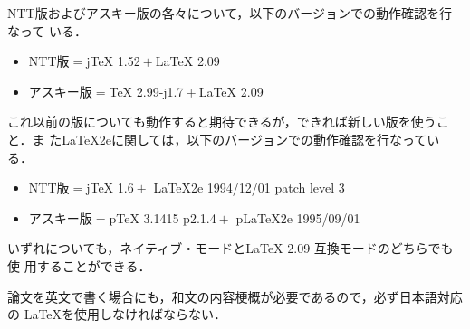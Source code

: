 \documentclass{newkuisthesis}
\def\LATEXe{\ifx\LaTeXe\undefined \LaTeX 2e\else\LaTeXe\fi}
\begin{document}
NTT版およびアスキー版の各々について，以下のバージョンでの動作確認を行なって
いる．
\begin{itemize}%
\item
NTT版${}={}${j\TeX} 1.52${}+{}${\LaTeX} 2.09
\item 
アスキー版${}={}${\TeX} 2.99-j1.7${}+{}${\LaTeX} 2.09
\end{itemize}%
これ以前の版についても動作すると期待できるが，できれば新しい版を使うこと．ま
た{\LATEXe}に関しては，以下のバージョンでの動作確認を行なっている．
\begin{itemize}%
\item
NTT版${}={}${j\TeX} 1.6${}+{}$%
	{\LATEXe} 1994/12/01 patch level 3
\item 
アスキー版${}={}${p\TeX} 3.1415 p2.1.4${}+{}$%
	{p\LATEXe} 1995/09/01
\end{itemize}%
いずれについても，ネイティブ・モードと{\LaTeX} 2.09 互換モードのどちらでも使
用することができる．

論文を英文で書く場合にも，和文の内容梗概が必要であるので，必ず日本語対応の
\LaTeX を使用しなければならない．

\end{document}
